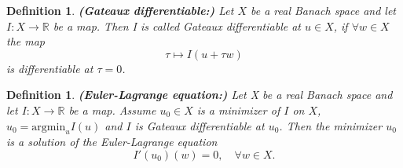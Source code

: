 \documentclass[12pt,openany]{book}
\newcommand{\R}{\mathbb{R}}
\theoremstyle{plainnormal}
\newtheorem{definition}[theorem]{Definition}
\theoremstyle{remark}
\begin{document}
\begin{definition}\textbf{(Gateaux differentiable:)}
    Let $X$ be a real Banach space and let \mbox{$I: X\rightarrow\R$} be a map. Then I is called \emph{Gateaux differentiable} at $u\in X$, if $\forall w\in X$ the map $$\tau \mapsto I(u + \tau w)$$ is differentiable at $\tau = 0$.
\end{definition}
\begin{definition}\label{EL_eq}\textbf{(Euler-Lagrange equation:)}
Let X be a real Banach space and let \mbox{$I: X\rightarrow\R$} be a map. Assume $u_0\in X$ is a minimizer of $I$ on $X$, $u_0 = \mathrm{argmin}_u I(u)$ and $I$ is Gateaux differentiable at $u_0$. Then the minimizer $u_0$ is a solution of the \emph{Euler-Lagrange equation} $$I'(u_0)(w) = 0, \quad \forall w \in X.$$
\end{definition}
\end{document}
